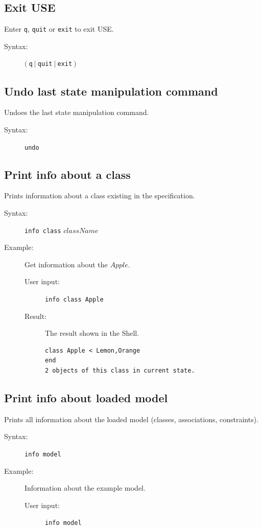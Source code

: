 \documentclass[a4paper,titlepage,oneside,final]{scrreprt} %
\begin{document}
\subsection{Exit USE}
Enter \verb+q+, \verb+quit+ or \verb+exit+ to exit USE.
\begin{description}
\item[Syntax:] $(~$\verb+q+$~|~$\verb+quit+$~|~$\verb+exit+$~)$
\end{description}
\subsection{Undo last state manipulation command}
Undoes the last state manipulation command.
\begin{description}
\item[Syntax:] \verb+undo+
\end{description}
\subsection{Print info about a class}
Prints information about a class existing in the specification.
\begin{description}
\item[Syntax:] \verb+info class+ $\mathit{className}$
\item[Example:] Get information about the $\mathit{Apple}$.
\begin{description}
\item[User input:]\verb+info class Apple+
\item[Result:] The result shown in the Shell.
\begin{verbatim}
class Apple < Lemon,Orange
end
2 objects of this class in current state.
\end{verbatim}
\end{description}
\end{description}
\subsection{Print info about loaded model}
Prints all information about the loaded model (classes, associations, constraints).
\begin{description}
\item[Syntax:] \verb+info model+
\item[Example:] Information about the example model.
\begin{description}
\item[User input:]\verb+info model+
\end{description}
\end{description}
\end{document}
